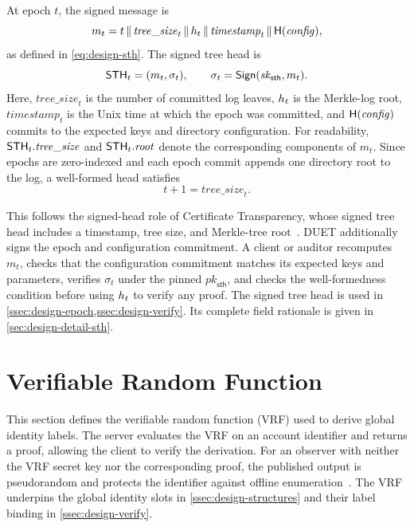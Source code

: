 \begin{definition}\label{def:sth}
At epoch $t$, the signed message is
\[
m_t =
t \,\|\, \mathit{tree\_size}_t \,\|\, h_{t} \,\|\,
\mathit{timestamp}_t \,\|\, \mathsf{H}(\mathit{config}),
\]
as defined in \cref{eq:design-sth}. The signed tree head is
\[
\mathsf{STH}_t=(m_t,\sigma_t),
\qquad
\sigma_t=\mathsf{Sign}(\mathit{sk}_{\mathsf{sth}},m_t).
\]
Here, $\mathit{tree\_size}_t$ is the number of committed log leaves,
$h_{t}$ is the Merkle-log root, $\mathit{timestamp}_t$ is the Unix time at which the epoch was
committed, and $\mathsf{H}(\mathit{config})$ commits to the expected keys and directory configuration.
For readability, $\mathsf{STH}_t.\mathit{tree\_size}$ and $\mathsf{STH}_t.\mathit{root}$ denote the
corresponding components of $m_t$.
Since epochs are zero-indexed and each epoch commit appends one directory root to the log, a
well-formed head satisfies
\[
t+1=\mathit{tree\_size}_t.
\]

This follows the signed-head role of Certificate Transparency, whose signed tree head includes a
timestamp, tree size, and Merkle-tree root~\cite[Sections~4.9 and~4.10]{rfc9162}. DUET additionally signs the
epoch and configuration commitment. A client or auditor recomputes $m_t$, checks that the
configuration commitment matches its expected keys and parameters, verifies $\sigma_t$ under the pinned
$\mathit{pk}_{\mathsf{sth}}$, and checks the well-formedness condition before using
$h_{t}$ to verify any proof. The signed tree head is used in
\cref{ssec:design-epoch,ssec:design-verify}. Its complete field rationale is given in
\cref{sec:design-detail-sth}.
\end{definition}

\section{Verifiable Random Function}\label{sec:def-vrf}

This section defines the verifiable random function (VRF) used to derive global identity labels. The
server evaluates the VRF on an account identifier and returns a proof, allowing the client to verify
the derivation. For an observer with neither the VRF secret key nor the corresponding proof, the
published output is pseudorandom and protects the identifier against offline
enumeration~\cite[Sections~1 and~3.4]{rfc9381}. The VRF underpins the global identity slots in
\cref{ssec:design-structures} and their label binding in \cref{ssec:design-verify}.

